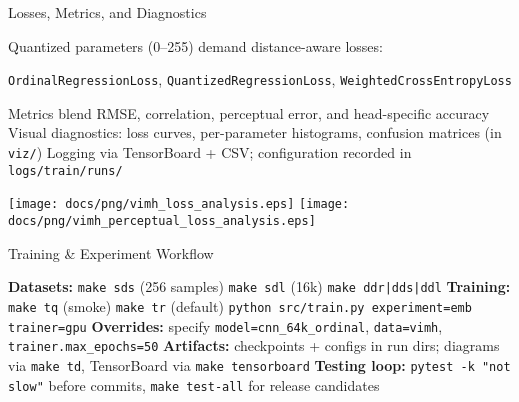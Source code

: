 \begin{slide}[\slideopts,toc={Losses}]{Losses, Metrics, and Diagnostics}
  \vspace{-0.75em}
  \begin{itemize}
    \mpitem Quantized parameters (0–255) demand distance-aware losses:
    \begin{itemize}
      \mpitem \texttt{OrdinalRegressionLoss}, \texttt{QuantizedRegressionLoss}, \texttt{WeightedCrossEntropyLoss}
    \end{itemize}
    \mpitem Metrics blend RMSE, correlation, perceptual error, and head-specific accuracy
    \mpitem Visual diagnostics: loss curves, per-parameter histograms, confusion matrices (in \texttt{viz/})
    \mpitem Logging via TensorBoard + CSV; configuration recorded in \texttt{logs/train/runs/}
  \end{itemize}
  \vspace{0.25em}
  \begin{center}
    \texttt{[image: docs/png/vimh\_loss\_analysis.eps]}\hspace{0.02\linewidth}
    \texttt{[image: docs/png/vimh\_perceptual\_loss\_analysis.eps]}
  \end{center}
\end{slide}

\begin{slide}[\slideopts,toc={Workflow}]{Training & Experiment Workflow}
  \vspace{-0.75em}
  \begin{itemize}
    \mpitem \textbf{Datasets:} \texttt{make sds} (256 samples) \textbar \texttt{make sdl} (16k) \textbar \texttt{make ddr|dds|ddl}
    \mpitem \textbf{Training:} \texttt{make tq} (smoke) \textbar \texttt{make tr} (default) \textbar \texttt{python src/train.py experiment=emb trainer=gpu}
    \mpitem \textbf{Overrides:} specify \texttt{model=cnn\_64k\_ordinal}, \texttt{data=vimh}, \texttt{trainer.max\_epochs=50}
    \mpitem \textbf{Artifacts:} checkpoints + configs in run dirs; diagrams via \texttt{make td}, TensorBoard via \texttt{make tensorboard}
    \mpitem \textbf{Testing loop:} \texttt{pytest -k "not slow"} before commits, \texttt{make test-all} for release candidates
  \end{itemize}
\end{slide}

